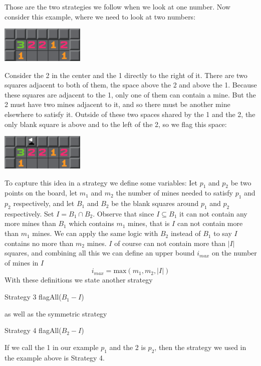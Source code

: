 \documentclass{article}
\theoremstyle{definition}
\theoremstyle{definition}
\theoremstyle{theorem}
\begin{document}
	Those are the two strategies we follow when we look at one number. Now consider this example, where we need to look at two numbers:
	\begin{center}
		\includegraphics[width=0.3\textwidth]{exampleimages/example2a}
	\end{center}
	Consider the 2 in the center and the 1 directly to the right of it. There are two squares adjacent to both of them, the space above the 2 and above the 1. Because these squares are adjacent to the 1, only one of them can contain a mine. But the 2 must have two mines adjacent to it, and so there must be another mine elsewhere to satisfy it. Outside of these two spaces shared by the  1 and the 2, the only blank square is above and to the left of the 2, so we flag this space:
	\begin{center}
		\includegraphics[width=0.3\textwidth]{exampleimages/example2b}
	\end{center}
	To capture this idea in a strategy we define some variables: Iet $p_1$ and $p_2$ be two points on the board, let $m_1$ and $m_2$ the number of mines needed to satisfy $p_1$ and $p_2$ respectively, and let $B_1$ and $B_2$ be the blank squares around $p_1$ and $p_2$ respectively. Set $I = B_1 \cap B_2$.  Observe that since $I \subseteq B_1$ it can not contain any more mines than $B_1$ which contains $m_1$ mines, that is $I$ can not contain more than $m_1$ mines. We can apply the same logic with $B_2$ instead of $B_1$ to say  $I$ contains no more than $m_2$ mines. $I$ of course can not contain more than $|I|$ squares, and combining all this we can define an upper bound $i_{max}$ on the number of mines in $I$
	$$i _{max} = \textrm{max}(m_1,m_2,|I|) $$
	With these definitions we state another strategy
	\begin{algorithmic}
		 \Comment Strategy 3
		\State flagAll($B_1 - I$)
		\EndIf
	\end{algorithmic}
	as well as the symmetric strategy
	\begin{algorithmic}
		 \Comment Strategy 4
		\State flagAll($B_2 - I$)
		\EndIf
	\end{algorithmic}
	If we call the 1 in our example $p_1$ and the 2 is $p_2$, then the strategy we used in the example above is Strategy 4. 
	
\end{document}
